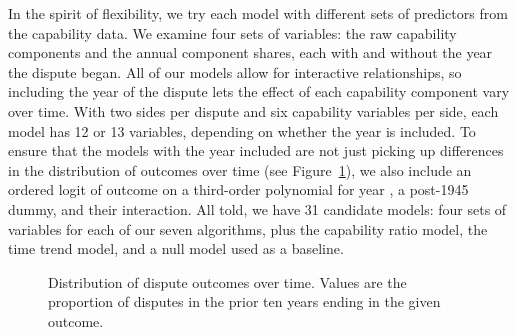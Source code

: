 In the spirit of flexibility, we try each model with different sets of predictors from the capability data.
We examine four sets of variables: the raw capability components and the annual component shares, each with and without the year the dispute began.
All of our models allow for interactive relationships, so including the year of
the dispute lets the effect of each capability component vary over time.
With two sides per dispute and six capability variables per side, each model has 12 or 13 variables, depending on whether the year is included.
To ensure that the models with the year included are not just picking up differences in the distribution of outcomes over time (see Figure~\ref{fig:outcomes-time}), we also include an ordered logit of outcome on a third-order polynomial for year \citep{Carter:2010dh}, a post-1945 dummy, and their interaction.
All told, we have 31 candidate models: four sets of variables for each of our seven algorithms, plus the capability ratio model, the time trend model, and a null model used as a baseline.

\begin{figure}[tp]
  \centering
  
  \caption{
    Distribution of dispute outcomes over time.
    Values are the proportion of disputes in the prior ten years ending in the given outcome.
  }
  \label{fig:outcomes-time}
\end{figure}

